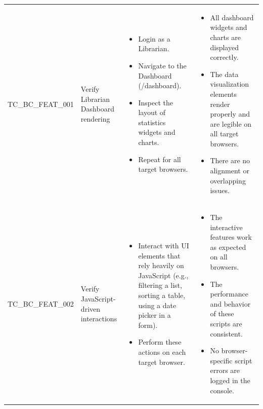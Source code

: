 \documentclass[10pt, a4paper]{report}
\begin{document}
\begin{longtable}{|>{\raggedright\arraybackslash}p{3cm}|>{\raggedright\arraybackslash}p{4.5cm}|>{\raggedright\arraybackslash}p{4.5cm}|>{\raggedright\arraybackslash}p{5.5cm}|}
\multicolumn{4}{|l|}{\textbf{Sub-Section: Feature-Specific Checks}} \\ \hline
TC\_BC\_FEAT\_001 & Verify Librarian Dashboard rendering & 
    \begin{itemize}[noitemsep, topsep=0pt, partopsep=0pt, leftmargin=*]
        \item Login as a Librarian.
        \item Navigate to the Dashboard (/dashboard).
        \item Inspect the layout of statistics widgets and charts.
        \item Repeat for all target browsers.
    \end{itemize} & 
    \begin{itemize}[noitemsep, topsep=0pt, partopsep=0pt, leftmargin=*]
        \item All dashboard widgets and charts are displayed correctly.
        \item The data visualization elements render properly and are legible on all target browsers.
        \item There are no alignment or overlapping issues.
    \end{itemize} \\ \hline
TC\_BC\_FEAT\_002 & Verify JavaScript-driven interactions & 
    \begin{itemize}[noitemsep, topsep=0pt, partopsep=0pt, leftmargin=*]
        \item Interact with UI elements that rely heavily on JavaScript (e.g., filtering a list, sorting a table, using a date picker in a form).
        \item Perform these actions on each target browser.
    \end{itemize} & 
    \begin{itemize}[noitemsep, topsep=0pt, partopsep=0pt, leftmargin=*]
        \item The interactive features work as expected on all browsers.
        \item The performance and behavior of these scripts are consistent.
        \item No browser-specific script errors are logged in the console.
    \end{itemize} \\ \hline

\end{longtable}
\end{document}
